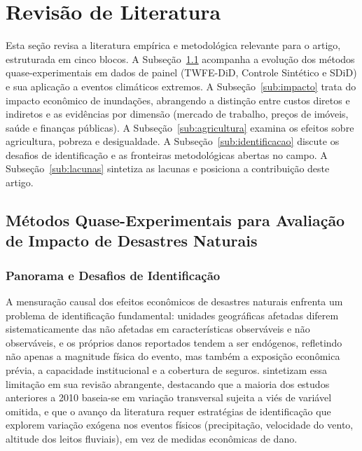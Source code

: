\documentclass[a4paper,12pt]{article}
\begin{document}
\section{Revisão de Literatura}
\label{sec:revisao}

Esta seção revisa a literatura empírica e metodológica relevante para o artigo,
estruturada em cinco blocos. A Subseção~\ref{sub:metodos} acompanha a evolução dos
métodos quase-experimentais em dados de painel (TWFE-DiD, Controle Sintético e
SDiD) e sua aplicação a eventos climáticos extremos. A Subseção~\ref{sub:impacto}
trata do impacto econômico de inundações, abrangendo a distinção entre custos diretos e
indiretos e as evidências por dimensão (mercado de trabalho, preços de imóveis, saúde e
finanças públicas). A Subseção~\ref{sub:agricultura} examina os efeitos sobre agricultura,
pobreza e desigualdade. A Subseção~\ref{sub:identificacao} discute os desafios de
identificação e as fronteiras metodológicas abertas no campo. A
Subseção~\ref{sub:lacunas} sintetiza as lacunas e posiciona a contribuição deste artigo.

\subsection{Métodos Quase-Experimentais para Avaliação de Impacto de Desastres
Naturais}
\label{sub:metodos}

\subsubsection{Panorama e Desafios de Identificação}

A mensuração causal dos efeitos econômicos de desastres naturais enfrenta um problema
de identificação fundamental: unidades geográficas afetadas diferem sistematicamente das
não afetadas em características observáveis e não observáveis, e os próprios danos
reportados tendem a ser endógenos, refletindo não apenas a magnitude física do evento,
mas também a exposição econômica prévia, a capacidade institucional e a cobertura de
seguros.  sintetizam essa limitação em sua revisão abrangente,
destacando que a maioria dos estudos anteriores a 2010 baseia-se em variação transversal
sujeita a viés de variável omitida, e que o avanço da literatura requer estratégias de
identificação que explorem variação exógena nos eventos físicos (precipitação,
velocidade do vento, altitude dos leitos fluviais), em vez de medidas econômicas de dano.
\end{document}
